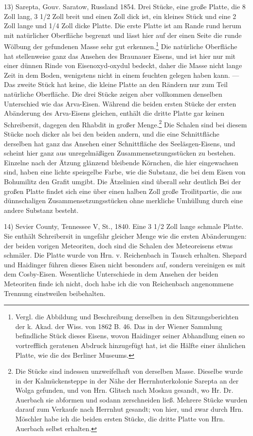 \documentclass[a4paper, 11pt, oneside]{article}
\begin{document}
13) Sarepta, Gouv. Saratow, Russland 1854. Drei Stücke, eine große Platte, die 8 Zoll lang, 3 1/2 Zoll breit und einen Zoll dick ist, ein kleines Stück und eine 2 Zoll lange und 1/4 Zoll dicke Platte. Die erste Platte ist am Rande rund herum mit natürlicher Oberfläche begrenzt und lässt hier auf der einen Seite die runde Wölbung der gefundenen Masse sehr gut erkennen.\footnote{Vergl. die Abbildung und Beschreibung derselben in den Sitzungsberichten der k. Akad. der Wiss. von 1862 B. 46. Das in der Wiener Sammlung befindliche Stück dieses Eisens, wovon Haidinger seiner Abhandlung einen so vortrefflich geratenen Abdruck hinzugefügt hat, ist die Hälfte einer ähnlichen Platte, wie die des Berliner Museums.} Die natürliche Oberfläche hat stellenweise ganz das Ansehen des Braunauer Eisens, und ist hier nur mit einer dünnen Rinde von Eisenoxyd-oxydul bedeckt, daher die Masse nicht lange Zeit in dem Boden, wenigstens nicht in einem feuchten gelegen haben kann. --- Das zweite Stück hat keine, die kleine Platte an den Rändern nur zum Teil natürliche Oberfläche. Die drei Stücke zeigen aber vollkommen denselben Unterschied wie das Arva-Eisen. Während die beiden ersten Stücke der ersten Abänderung des Arva-Eisens gleichen, enthält die dritte Platte gar keinen Schreibersit, dagegen den Rhabdit in großer Menge.\footnote{Die Stücke sind indessen unzweifelhaft von derselben Masse. Dieselbe wurde in der Kalmückensteppe in der Nähe der Herrnhuterkolonie Sarepta an der Wolga gefunden, und von Hrn. Glitsch nach Moskau gesandt, wo Hr. Dr. Auerbach sie abformen und sodann zerschneiden ließ. Mehrere Stücke wurden darauf zum Verkaufe nach Herrnhut gesandt; von hier, und zwar durch Hrn. Möschler habe ich die beiden ersten Stücke, die dritte Platte von Hrn. Auerbach selbst erhalten.} Die Schalen sind bei diesem Stücke noch dicker als bei den beiden andern, und die eine Schnittfläche derselben hat ganz das Ansehen einer Schnittfläche des Seeläsgen-Eisens, und scheint hier ganz aus unregelmäßigen Zusammensetzungsstücken zu bestehen. Einzelne nach der Ätzung glänzend bleibende Körnchen, die hier eingewachsen sind, haben eine lichte speisgelbe Farbe, wie die Substanz, die bei dem Eisen von Bohumilitz den Grafit umgibt. Die Ätzelinien sind überall sehr deutlich Bei der großen Platte findet sich eine über einen halben Zoll große Troilitpartie, die aus dünnschaligen Zusammensetzungsstücken ohne merkliche Umhüllung durch eine andere Substanz besteht.

14) Sevier County, Tennessee V, St., 1840. Eine 3 1/2 Zoll lange schmale Platte. Sie enthält Schreibersit in ungefähr gleicher Menge wie die ersten Abänderungen: der beiden vorigen Meteoriten, doch sind die Schalen des Meteoreisens etwas schmäler. Die Platte wurde von Hrn. v. Reichenbach in Tausch erhalten. Shepard und Haidinger führen dieses Eisen nicht besonders auf, sondern vereinigen es mit dem Cosby-Eisen. Wesentliche Unterschiede in dem Ansehen der beiden Meteoriten finde ich nicht, doch habe ich die von Reichenbach angenommene Trennung einstweilen beibehalten.
\end{document}
